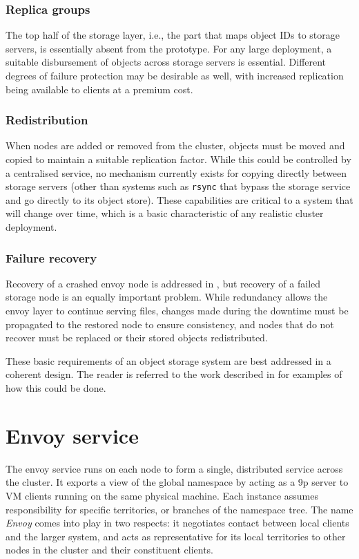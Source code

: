 \subsubsection{Replica groups}

The top half of the storage layer, i.e., the part that maps object IDs to storage servers, is essentially absent from the prototype. For any large deployment, a suitable disbursement of objects across storage servers is essential. Different degrees of failure protection may be desirable as well, with increased replication being available to clients at a premium cost.

\subsubsection{Redistribution}

When nodes are added or removed from the cluster, objects must be moved and copied to maintain a suitable replication factor. While this could be controlled by a centralised service, no mechanism currently exists for copying directly between storage servers (other than systems such as \texttt{rsync} that bypass the storage service and go directly to its object store). These capabilities are critical to a system that will change over time, which is a basic characteristic of any realistic cluster deployment.

\subsubsection{Failure recovery}

Recovery of a crashed envoy node is addressed in , but recovery of a failed storage node is an equally important problem. While redundancy allows the envoy layer to continue serving files, changes made during the downtime must be propagated to the restored node to ensure consistency, and nodes that do not recover must be replaced or their stored objects redistributed.

These basic requirements of an object storage system are best addressed in a coherent design. The reader is referred to the work described in  for examples of how this could be done.

\section{Envoy service}

The envoy service runs on each node to form a single, distributed service across the cluster. It exports a view of the global namespace by acting as a 9p server to VM clients running on the same physical machine. Each instance assumes responsibility for specific territories, or branches of the namespace tree. The name \emph{Envoy} comes into play in two respects: it negotiates contact between local clients and the larger system, and acts as representative for its local territories to other nodes in the cluster and their constituent clients.

